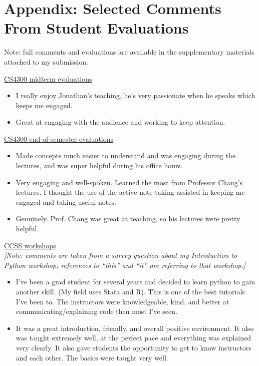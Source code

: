 \documentclass[12pt,letterpaper]{article}
\newcommand{\appendixpreamble}{in the supplementary materials attached to my submission.}
\newcommand{\appendixpreamble}{by request.}
\begin{document}
\ifappendix
\vspace{\baselineskip}
\section{Appendix: Selected Comments From Student Evaluations}
Note: full comments and evaluations are available \appendixpreamble


\noindent\underline{CS4300 midterm evaluations}
\begin{itemize}
    \item I really enjoy Jonathan's teaching, he's very passionate when he speaks which keeps me engaged.
    \item Great at engaging with the audience and working to keep attention.
\end{itemize}

\noindent\underline{CS4300 end-of-semester evaluations}
\begin{itemize}
    \item Made concepts much easier to understand and was engaging during the lectures, and was super helpful during his office hours.
    \item Very engaging and well-spoken. Learned the most from Professor Chang's lectures. I thought the use of the active note taking assisted in keeping me engaged and taking useful notes.
    \item Genuinely. Prof. Chang was great at teaching, so his lectures were pretty helpful.
\end{itemize}

\noindent\underline{CCSS workshops}\\
\emph{[Note: comments are taken from a survey question about my Introduction to Python workshop; references to ``this'' and ``it'' are referring to that workshop.]}
\begin{itemize}
    \item I've been a grad student for several years and decided to learn python to gain another skill. (My field uses Stata and R). This is one of the best tutorials I've been to. The instructors were knowledgeable, kind, and better at communicating/explaining code then most I've seen. 
    \item It was a great introduction, friendly, and overall positive environment. It also was taught extremely well, at the perfect pace and everything was explained very clearly. It also gave students the opportunity to get to know instructors and each other. The basics were taught very well.
\end{itemize}

\else
%
\fi
\end{document}
